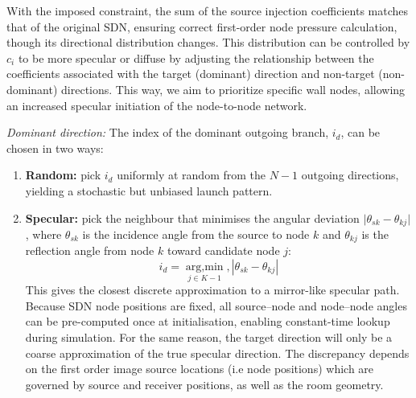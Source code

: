 \documentclass[journal]{IEEEtran}
\begin{document}
With the imposed constraint, the sum of the source injection coefficients matches that of the original SDN, ensuring correct first-order node pressure calculation, though its directional distribution changes. This distribution can be controlled by $c_i$ to be more specular or diffuse by adjusting the relationship between the coefficients associated with the target (dominant) direction and non-target (non-dominant) directions. This way, we aim to prioritize specific wall nodes, allowing an increased specular initiation of the node-to-node network.


\textit{Dominant direction:} The index of the dominant outgoing branch, \(i_d\), can be chosen in two
ways:

\begin{enumerate}
  \item \textbf{Random:} pick \(i_d\) uniformly at random from the
        \(N-1\) outgoing directions, yielding a stochastic but
        unbiased launch pattern.
  \item \textbf{Specular:} pick the neighbour that minimises the angular
        deviation
        \(\lvert\theta_{sk}-\theta_{kj}\rvert\), where
        \(\theta_{sk}\) is the incidence angle from the source to node
        \(k\) and \(\theta_{kj}\) is the reflection angle from node
        \(k\) toward candidate node \(j\):
        \begin{equation}
        \label{eq:specular_id_selection}
        i_{d} = \mathop{\mathrm{arg,min}}\limits_{j \in {K-1}} , \left| \theta_{sk} - \theta_{kj} \right|
        \end{equation}
        This gives the closest discrete approximation to a
        mirror-like specular path.  Because SDN node positions are
        fixed, all source–node and node–node angles can be
        pre-computed once at initialisation, enabling constant-time lookup during simulation. For the same reason, the target direction will only be a coarse approximation of the true specular direction. The discrepancy depends on the first order image source locations (i.e node positions) which are governed by source and receiver positions, as well as the room geometry.
\end{enumerate}
\end{document}
